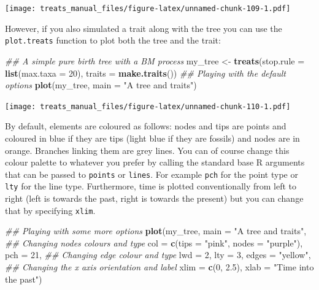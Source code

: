 \documentclass[
]{book}
\newenvironment{Shaded}{\begin{snugshade}}{\end{snugshade}}
\newcommand{\CommentTok}[1]{\textcolor[rgb]{0.56,0.35,0.01}{\textit{#1}}}
\newcommand{\DataTypeTok}[1]{\textcolor[rgb]{0.13,0.29,0.53}{#1}}
\newcommand{\DecValTok}[1]{\textcolor[rgb]{0.00,0.00,0.81}{#1}}
\newcommand{\FloatTok}[1]{\textcolor[rgb]{0.00,0.00,0.81}{#1}}
\newcommand{\KeywordTok}[1]{\textcolor[rgb]{0.13,0.29,0.53}{\textbf{#1}}}
\newcommand{\NormalTok}[1]{#1}
\newcommand{\StringTok}[1]{\textcolor[rgb]{0.31,0.60,0.02}{#1}}
\begin{document}
\texttt{[image: treats\_manual\_files/figure-latex/unnamed-chunk-109-1.pdf]}

However, if you also simulated a trait along with the tree you can use the \texttt{plot.treats} function to plot both the tree and the trait:

\begin{Shaded}
\begin{Highlighting}[]
\CommentTok{\#\# A simple pure birth tree with a BM process}
\NormalTok{my\_tree \textless{}{-}}\StringTok{ }\KeywordTok{treats}\NormalTok{(}\DataTypeTok{stop.rule =} \KeywordTok{list}\NormalTok{(}\DataTypeTok{max.taxa =} \DecValTok{20}\NormalTok{), }\DataTypeTok{traits =} \KeywordTok{make.traits}\NormalTok{())}
\CommentTok{\#\# Playing with the default options}
\KeywordTok{plot}\NormalTok{(my\_tree, }\DataTypeTok{main =} \StringTok{"A tree and traits"}\NormalTok{)}
\end{Highlighting}
\end{Shaded}

\texttt{[image: treats\_manual\_files/figure-latex/unnamed-chunk-110-1.pdf]}

By default, elements are coloured as follows: nodes and tips are points and coloured in blue if they are tips (light blue if they are fossils) and nodes are in orange.
Branches linking them are grey lines.
You can of course change this colour palette to whatever you prefer by calling the standard base R arguments that can be passed to \texttt{points} or \texttt{lines}. For example \texttt{pch} for the point type or \texttt{lty} for the line type.
Furthermore, time is plotted conventionally from left to right (left is towards the past, right is towards the present) but you can change that by specifying \texttt{xlim}.

\begin{Shaded}
\begin{Highlighting}[]
\CommentTok{\#\# Playing with some more options}
\KeywordTok{plot}\NormalTok{(my\_tree, }\DataTypeTok{main =} \StringTok{"A tree and traits"}\NormalTok{,}
     \CommentTok{\#\# Changing nodes colours and type}
     \DataTypeTok{col =} \KeywordTok{c}\NormalTok{(}\DataTypeTok{tips =} \StringTok{"pink"}\NormalTok{, }\DataTypeTok{nodes =} \StringTok{"purple"}\NormalTok{), }\DataTypeTok{pch =} \DecValTok{21}\NormalTok{,}
     \CommentTok{\#\# Changing edge colour and type}
     \DataTypeTok{lwd =} \DecValTok{2}\NormalTok{, }\DataTypeTok{lty =} \DecValTok{3}\NormalTok{, }\DataTypeTok{edges =} \StringTok{"yellow"}\NormalTok{,}
     \CommentTok{\#\# Changing the x axis orientation and label}
     \DataTypeTok{xlim =} \KeywordTok{c}\NormalTok{(}\DecValTok{0}\NormalTok{, }\FloatTok{2.5}\NormalTok{), }\DataTypeTok{xlab =} \StringTok{"Time into the past"}\NormalTok{)}
\end{Highlighting}
\end{Shaded}
\end{document}
